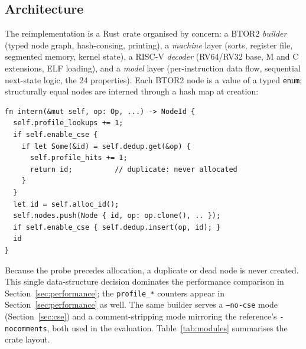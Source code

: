 \documentclass[sigplan,screen,nonacm]{acmart}
\begin{document}
\subsection{Architecture}

The reimplementation is a Rust crate organised by concern: a BTOR2
\emph{builder} (typed node graph, hash-consing, printing), a
\emph{machine} layer (sorts, register file, segmented memory, kernel
state), a RISC-V \emph{decoder} (RV64/RV32 base, M and C extensions,
ELF loading), and a \emph{model} layer (per-instruction data flow,
sequential next-state logic, the 24 properties). Each BTOR2 node is a
value of a typed \texttt{enum}; structurally equal nodes are interned
through a hash map at creation:

\begin{lstlisting}
fn intern(&mut self, op: Op, ...) -> NodeId {
  self.profile_lookups += 1;
  if self.enable_cse {
    if let Some(&id) = self.dedup.get(&op) {
      self.profile_hits += 1;
      return id;          // duplicate: never allocated
    }
  }
  let id = self.alloc_id();
  self.nodes.push(Node { id, op: op.clone(), .. });
  if self.enable_cse { self.dedup.insert(op, id); }
  id
}
\end{lstlisting}

\noindent Because the probe precedes allocation, a duplicate or dead
node is never created. This single data-structure decision dominates
the performance comparison in Section~\ref{sec:performance}; the
\texttt{profile\_*} counters appear in
Section~\ref{sec:performance} as well. The same builder serves a
\texttt{--no-cse} mode (Section~\ref{sec:cse}) and a comment-stripping
mode mirroring the reference's \texttt{-nocomments}, both used in the
evaluation. Table~\ref{tab:modules} summarises the crate layout.
\end{document}
